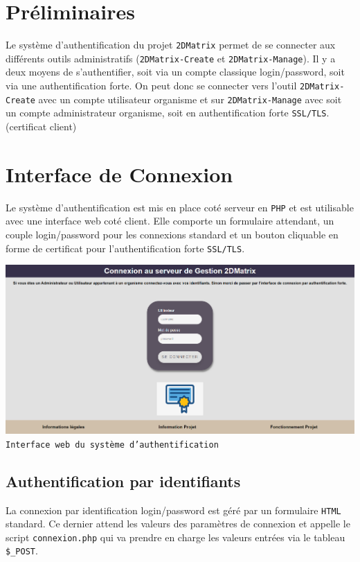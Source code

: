 \section{Préliminaires}

Le système d'authentification du projet \texttt{2DMatrix} permet de se connecter aux différents outils administratifs (\texttt{2DMatrix-Create} et \texttt{2DMatrix-Manage}). Il y a deux moyens de s'authentifier, soit via un compte classique login/password, soit via une authentification forte. On peut donc se connecter vers l'outil \texttt{2DMatrix-Create} avec un compte utilisateur organisme et sur \texttt{2DMatrix-Manage} avec soit un compte administrateur organisme, soit en authentification forte \texttt{SSL/TLS}. (certificat client) 

\section{Interface de Connexion}

Le système d'authentification est mis en place coté serveur en \texttt{PHP} et est utilisable avec une interface web coté client. Elle comporte un formulaire attendant, un couple login/password pour les connexions standard et un bouton cliquable en forme de certificat pour l'authentification forte \texttt{SSL/TLS}.

\begin{center}
    \includegraphics[scale=0.3]{imgs/authPNG.PNG}\\
    \texttt{Interface web du système d'authentification}
\end{center}

\subsection{Authentification par identifiants}

La connexion par identification login/password est géré par un formulaire \texttt{HTML} standard. Ce dernier attend les valeurs des paramètres de connexion et appelle le script \texttt{connexion.php} qui va prendre en charge les valeurs entrées via le tableau \texttt{\$\_POST}.


